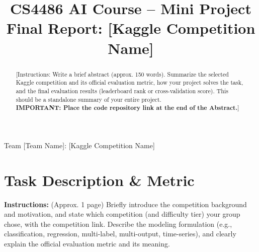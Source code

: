 \documentclass[journal]{IEEEtran}
\begin{document}
\title{CS4486 AI Course -- Mini Project Final Report: [Kaggle Competition Name]}

\author{

    \vspace{1em}
    
}

%
{Team [Team Name]: [Kaggle Competition Name]}

\maketitle

\begin{abstract}
[Instructions: Write a brief abstract (approx. 150 words). Summarize the selected Kaggle competition and its official evaluation metric, how your project solves the task, and the final evaluation results (leaderboard rank or cross-validation score). This should be a standalone summary of your entire project. \\ \textbf{IMPORTANT: Place the code repository link at the end of the Abstract.}]
\end{abstract}

\begin{IEEEkeywords}
\end{IEEEkeywords}

\section{Task Description \& Metric}
\label{sec:task}
\textbf{Instructions:} (Approx. 1 page)
Briefly introduce the competition background and motivation, and state which competition (and difficulty tier) your group chose, with the competition link. Describe the modeling formulation (e.g., classification, regression, multi-label, multi-output, time-series), and clearly explain the official evaluation metric and its meaning.
\end{document}
